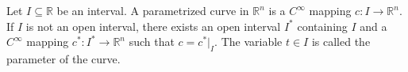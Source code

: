 Let $I \subseteq \mathbb{R}$ be an interval. A parametrized curve in $\mathbb{R}^n$ is a $C^\infty$ mapping $c: I \rightarrow \mathbb{R}^n$. If $I$ is not an open interval, there exists an open interval $I^*$ containing $I$ and a $C^\infty$ mapping $c^*: I^* \rightarrow \mathbb{R}^n$ such that $c = c^*|_I$. The variable $t \in I$ is called the parameter of the curve.
